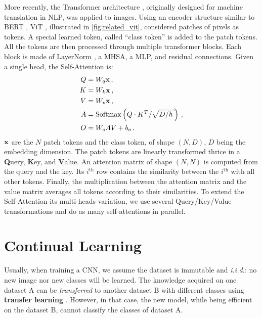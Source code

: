 More recently, the Transformer architecture \citep{vaswani2017transformer}, originally designed for
machine translation in \ac{NLP}, was applied to images. Using an encoder structure similar to BERT
\citep{devlin2018bert}, ViT \citep{dosovitskiy2020vit}, illustrated in \autoref{fig:related_vit},
considered patches of pixels as tokens. A special learned token, called ``class token'' is added to
the patch tokens. All the tokens are then processed through multiple transformer blocks. Each block
is made of LayerNorm \citep{ba2016layernorm}, a \ac{MHSA}, a \ac{MLP}, and residual connections.
Given a single head, the Self-Attention is:
%
\begin{equation}
      \begin{aligned}
            Q & =W_{q} \vx\,,                                                       \\
            K & =W_{k} \vx\,,                                                       \\
            V & =W_{v} \vx\,,                                                       \\
            A & =\operatorname{Softmax}\left(Q \cdot K^{T} / \sqrt{D / h}\right)\,, \\
            O & = W_{o} A V+b_{o}\,.
      \end{aligned}
      \label{sec:related_sa}
\end{equation}
%
$\mathbf{x}$ are the $N$ patch tokens and the class token, of shape $(N, D)$, $D$ being the embedding
dimension. The patch tokens are linearly transformed thrice in a \textbf{Q}uery, \textbf{K}ey, and
\textbf{V}alue. An attention matrix of shape $(N, N)$ is computed from the query and the key. Its
$i^{\text{th}}$ row contains the similarity between the $i^{\text{th}}$ with all other tokens.
Finally, the multiplication between the attention matrix and the value matrix averages all tokens
according to their similarities. To extend the Self-Attention its multi-heads variation, we use
several Query/Key/Value transformations and do as many self-attentions in parallel.

\section{Continual Learning}
\label{sec:related_continual}

Usually, when training a \ac{CNN}, we assume the dataset is immutable and \textit{i.i.d.}: no new
image nor new classes will be learned. The knowledge acquired on one dataset A can be
\textit{transferred} to another dataset B with different classes using \textbf{transfer learning}
\citep{razavian2014transferlearning}. However, in that case, the new model, while being efficient on
the dataset B, cannot classify the classes of dataset A.

